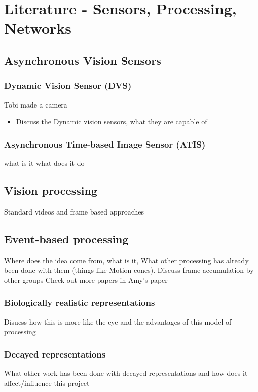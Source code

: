 \chapter{Literature - Sensors, Processing, Networks}


\section{Asynchronous Vision Sensors}  %
\subsection{Dynamic Vision Sensor (DVS)}
Tobi made a camera \cite{tobidvs}
\begin{itemize}
    \item Discuss the Dynamic vision sensors, what they are capable of
\end{itemize}

\subsection{Asynchronous Time-based Image Sensor (ATIS)}
what is it what does it do

\pagebreak
\section{Vision processing}   %
Standard videos and frame based approaches

\pagebreak
\section{Event-based processing}     %
Where does the idea come from, what is it, 
What other processing has already been done with them (things like Motion cones).
Discuss frame accumulation by other groups
Check out more papers in Amy's paper

\subsection{Biologically realistic representations}
Disucss how this is more like the eye and the advantages of this model of processing

\pagebreak
\subsection{Decayed representations}  %
What other work has been done with decayed representations and how does it affect/influence this project

